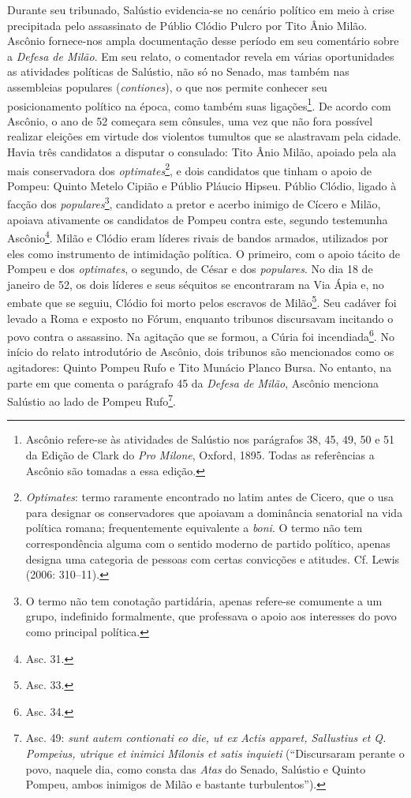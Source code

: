 Durante seu tribunado, Salústio evidencia-se no cenário político em meio à
crise precipitada pelo assassinato de Públio Clódio Pulcro por Tito Ânio Milão.
Ascônio fornece-nos ampla documentação desse período em seu comentário
 sobre a \emph{Defesa de Milão}. Em seu relato,
o comentador revela em várias oportunidades as atividades políticas de Salústio, não
só no Senado, mas também nas assembleias populares (\emph{contiones}), o que
nos permite conhecer seu posicionamento político na época, como também suas
ligações\footnote{Ascônio refere-se às atividades de Salústio nos parágrafos
38, 45, 49, 50 e 51 da Edição de Clark do \emph{Pro Milone}, Oxford, 1895.
Todas as referências a Ascônio são tomadas a essa edição.}.
De acordo com Ascônio, o ano de 52 começara sem cônsules, uma vez que não fora possível realizar eleições em virtude dos violentos tumultos que
se alastravam pela cidade. Havia três candidatos a disputar o consulado: Tito
Ânio Milão, apoiado pela ala mais conservadora dos \emph{optimates}\footnote{\emph{Optimates}: termo raramente encontrado no latim antes de Cicero, que o
usa para designar os conservadores que apoiavam a dominância senatorial na vida
política romana; frequentemente equivalente a \emph{boni}. O termo não tem
correspondência alguma com o sentido moderno de partido político, apenas
designa uma categoria de pessoas com certas convicções e atitudes. Cf. Lewis
(2006: 310--11).}, e dois candidatos que tinham o apoio de Pompeu: Quinto
Metelo Cipião e Públio Pláucio Hipseu. Públio Clódio, ligado à facção dos
\emph{populares}\footnote{O termo não tem conotação partidária, apenas
refere-se comumente a um grupo, indefinido formalmente, que professava o apoio aos interesses do povo como principal política.}, candidato a pretor e acerbo inimigo de Cícero e Milão,  apoiava
ativamente os candidatos de Pompeu contra este, segundo testemunha
Ascônio\footnote{Asc. 31.}.  Milão e Clódio eram líderes rivais de bandos
armados, utilizados por eles como instrumento de intimidação política.  O
primeiro, com o apoio tácito de Pompeu e dos \emph{optimates}, o segundo, de
César e dos \emph{populares}. No dia 18 de janeiro de 52, os dois líderes e
seus séquitos se encontraram na Via Ápia e, no embate que se seguiu, Clódio foi
morto pelos escravos de Milão\footnote{Asc. 33.}. Seu cadáver foi levado a
Roma e exposto no Fórum, enquanto tribunos discursavam incitando o povo contra
o assassino. Na agitação que se formou, a Cúria foi incendiada\footnote{Asc. 34.}.
No início do relato introdutório de Ascônio, dois tribunos são mencionados como
os agitadores: Quinto Pompeu Rufo e Tito Munácio Planco Bursa.  No entanto, na
parte em que comenta o parágrafo 45 da \emph{Defesa de Milão}, Ascônio menciona
Salústio ao lado de Pompeu Rufo\footnote{ Asc. 49: \emph{sunt autem contionati
eo die, ut ex Actis apparet, Sallustius et Q. Pompeius, utrique et inimici
Milonis et satis inquieti} (``Discursaram perante o povo, naquele dia, como consta das \emph{Atas} do Senado, Salústio e Quinto Pompeu, ambos inimigos de Milão e bastante
turbulentos'').}.

